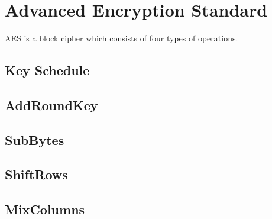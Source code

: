 \section{Advanced Encryption Standard}
\label{sec:aes}

AES is a block cipher which consists of four types of operations.

\subsection{Key Schedule}
	
	

\subsection{AddRoundKey}
	
	

\subsection{SubBytes}
	
	

\subsection{ShiftRows}
	
	

\subsection{MixColumns}
	
	
